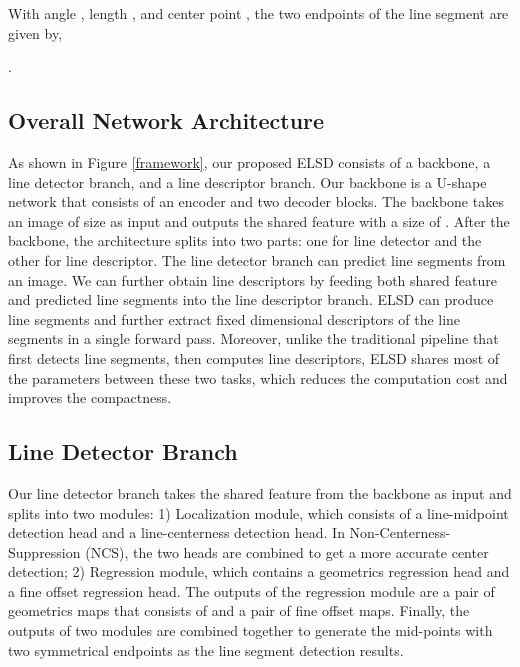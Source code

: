 \documentclass[10pt,twocolumn,letterpaper]{article}
\begin{document}
With angle , length , and center point , the two endpoints of the line segment are given by,

\begin{small}
.
\end{small}


\subsection{Overall Network Architecture}
As shown in Figure \ref{framework}, our proposed ELSD consists of a backbone, a line detector branch, and a line descriptor branch. Our backbone is a U-shape network that consists of an encoder and two decoder blocks. The backbone takes an image of size  as input and outputs the shared feature with a size of . After the backbone, the architecture splits into two parts: one for line detector and the other for line descriptor. The line detector branch can predict line segments from an image. We can further obtain line descriptors by feeding both shared feature and predicted line segments into the line descriptor branch. ELSD can produce line segments and further extract fixed dimensional descriptors of the line segments in a single forward pass. Moreover, unlike the traditional pipeline that first detects line segments, then computes line descriptors, ELSD shares most of the parameters between these two tasks, which reduces the computation cost and improves the compactness. 




\subsection{Line Detector Branch}
Our line detector branch takes the shared feature from the backbone as input and splits into two modules: 1) Localization module, which consists of a line-midpoint detection head and a line-centerness detection head. In Non-Centerness-Suppression (NCS), the two heads are combined to get a more accurate center detection; 2) Regression module, which contains a geometrics regression head and a fine offset regression head. The outputs of the regression module are a pair of geometrics maps that consists of  and a pair of fine offset maps. Finally, the outputs of two modules are combined together to generate the mid-points with two symmetrical endpoints as the line segment detection results.
\end{document}
